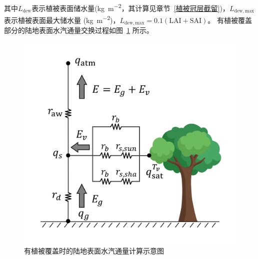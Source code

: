 其中$L_{\mathrm{dew}}$表示植被表面储水量(\unit{kg.m^{-2}}，其计算见章节~\ref{植被冠层截留})，$L_{\mathrm{dew,max}}$表示植被表面最大储水量
(\unit{kg.m^{-2}})，$L_{\mathrm{dew,max}}=0.1\left(\text {LAI}+ \text {SAI}\right)$。
有植被覆盖部分的陆地表面水汽通量交换过程如图~\ref{fig:有植被覆盖部分的陆地表面水汽通量示意图} 所示。
{
  \begin{figure}[htbp]
    \centering
    \includegraphics[width=0.6\linewidth]{Figures/地表湍流交换过程/有植被潜热交换阻抗示意图.png}
    \caption{有植被覆盖时的陆地表面水汽通量计算示意图}
    \label{fig:有植被覆盖部分的陆地表面水汽通量示意图}
  \end{figure}
}

